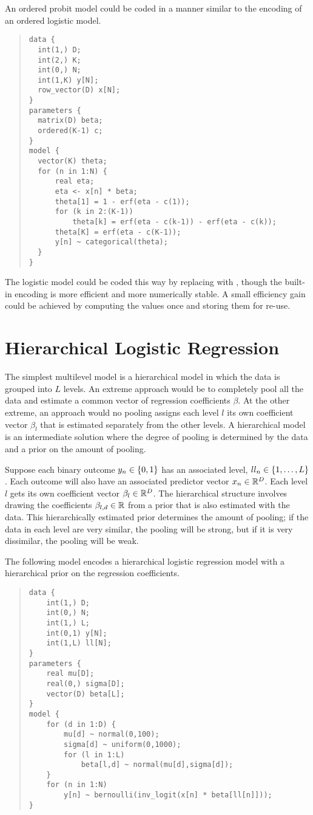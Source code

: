 An ordered probit model could be coded in a manner similar to the
\BUGS encoding of an ordered logistic model.
%
\begin{quote}
\begin{Verbatim}
data {
  int(1,) D;
  int(2,) K;
  int(0,) N;
  int(1,K) y[N];
  row_vector(D) x[N];
}
parameters {
  matrix(D) beta;
  ordered(K-1) c;
}
model {
  vector(K) theta;
  for (n in 1:N) {
      real eta;
      eta <- x[n] * beta;
      theta[1] = 1 - erf(eta - c(1));
      for (k in 2:(K-1))
          theta[k] = erf(eta - c(k-1)) - erf(eta - c(k));
      theta[K] = erf(eta - c(K-1));
      y[n] ~ categorical(theta);
  }
}
\end{Verbatim}
\end{quote}
%
The logistic model could be coded this way by replacing 
with , though the built-in encoding is more efficient
and more numerically stable.  A small efficiency gain could be
achieved by computing the values  once and
storing them for re-use.

\section{Hierarchical Logistic Regression}

The simplest multilevel model is a hierarchical model in which the
data is grouped into $L$ levels.  An extreme approach would be to
completely pool all the data and estimate a common vector of
regression coefficients $\beta$.  At the other extreme, an approach
would no pooling assigns each level $l$ its own coefficient vector
$\beta_l$ that is estimated separately from the other levels.  A
hierarchical model is an intermediate solution where the degree of
pooling is determined by the data and a prior on the amount of
pooling.

Suppose each binary outcome $y_n \in \{ 0,1 \}$ has an associated
level, $ll_n \in \{ 1,\ldots,L \}$.  Each outcome will also have
an associated predictor vector $x_n \in \mathbb{R}^D$.  Each level $l$
gets its own coefficient vector $\beta_l \in \mathbb{R}^D$.  The
hierarchical structure involves drawing the coefficients $\beta_{l,d}
\in \mathbb{R}$ from a prior that is also estimated with the data.  This
hierarchically estimated prior determines the amount of pooling; if
the data in each level are very similar, the pooling will be strong,
but if it is very dissimilar, the pooling will be weak.

The following model encodes a hierarchical logistic regression model
with a hierarchical prior on the regression coefficients.
%
\begin{quote}
\begin{Verbatim}
data {
    int(1,) D;
    int(0,) N;
    int(1,) L;
    int(0,1) y[N];
    int(1,L) ll[N];
}
parameters {
    real mu[D];
    real(0,) sigma[D];
    vector(D) beta[L];
}
model {
    for (d in 1:D) {
        mu[d] ~ normal(0,100);
        sigma[d] ~ uniform(0,1000);
        for (l in 1:L)
            beta[l,d] ~ normal(mu[d],sigma[d]);
    }
    for (n in 1:N)
        y[n] ~ bernoulli(inv_logit(x[n] * beta[ll[n]]));
}
\end{Verbatim}
\end{quote}   


